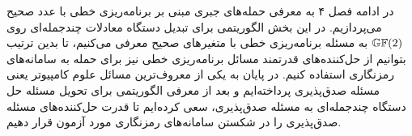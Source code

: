 در ادامه فصل ۴ به معرفی حمله‌های جبری مبنی بر برنامه‌ریزی خطی با عدد صحیح می‌پردازیم. در این بخش الگوریتمی برای تبدیل دستگاه معادلات چندجمله‌ای روی 
$\mathbb{GF}(2)$
به مسئله برنامه‌ریزی خطی با متغیرهای صحیح معرفی می‌کنیم، تا بدین ترتیب بتوانیم از حل‌کننده‌های قدرتمند مسائل برنامه‌ریزی خطی  نیز برای حمله به سامانه‌های رمزنگاری استفاده کنیم. در پایان به یکی از معروف‌ترین مسائل علوم کامپیوتر یعنی مسئله صدق‌پذیری پرداخته‌ایم و بعد از  معرفی الگوریتمی برای تحویل مسئله حل دستگاه  چندجمله‌ای به مسئله صدق‌پذیری، سعی کرده‌ایم  تا قدرت حل‌کننده‌های مسئله صدق‌پذیری را در شکستن سامانه‌های رمزنگاری مورد آزمون قرار دهیم. 
